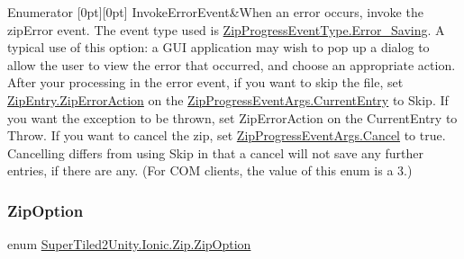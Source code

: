 \begin{DoxyEnumFields}{Enumerator}
[0pt][0pt]{}\mbox{\label{namespace_super_tiled2_unity_1_1_ionic_1_1_zip_a5597d8881459658d304cdc5fdae35593a438494fa2a47a746a5f0660862a5bf68}} 
Invoke\+Error\+Event&When an error occurs, invoke the zip\+Error event. The event type used is \mbox{\hyperlink{namespace_super_tiled2_unity_1_1_ionic_1_1_zip_a6584db8196e626ddfc455e74d31a841fa6d93d77ba4439ec2a5bf59f7282b906f}{Zip\+Progress\+Event\+Type.\+Error\+\_\+\+Saving}}. A typical use of this option\+: a G\+UI application may wish to pop up a dialog to allow the user to view the error that occurred, and choose an appropriate action. After your processing in the error event, if you want to skip the file, set \mbox{\hyperlink{class_super_tiled2_unity_1_1_ionic_1_1_zip_1_1_zip_entry_a55a679298f00c5eef672e947c6293304}{Zip\+Entry.\+Zip\+Error\+Action}} on the {\ttfamily \mbox{\hyperlink{class_super_tiled2_unity_1_1_ionic_1_1_zip_1_1_zip_progress_event_args_aa2cf173f83591b5b52e15ca4c9d34129}{Zip\+Progress\+Event\+Args.\+Current\+Entry}}} to {\ttfamily Skip}. If you want the exception to be thrown, set {\ttfamily Zip\+Error\+Action} on the {\ttfamily Current\+Entry} to {\ttfamily Throw}. If you want to cancel the zip, set {\ttfamily \mbox{\hyperlink{class_super_tiled2_unity_1_1_ionic_1_1_zip_1_1_zip_progress_event_args_a91248747aca5704f3cab69af3a289028}{Zip\+Progress\+Event\+Args.\+Cancel}}} to true. Cancelling differs from using Skip in that a cancel will not save any further entries, if there are any. (For C\+OM clients, the value of this enum is a 3.) \\
\hline

\end{DoxyEnumFields}
\mbox{\label{namespace_super_tiled2_unity_1_1_ionic_1_1_zip_a25d431031427c142eba970006eee630c}} 
\subsubsection{\texorpdfstring{Zip\+Option}{ZipOption}}
{\footnotesize\ttfamily enum \mbox{\hyperlink{namespace_super_tiled2_unity_1_1_ionic_1_1_zip_a25d431031427c142eba970006eee630c}{Super\+Tiled2\+Unity.\+Ionic.\+Zip.\+Zip\+Option}}\hspace{0.3cm}{\ttfamily [strong]}}



